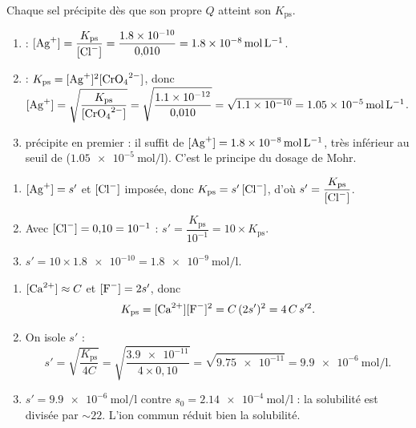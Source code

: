 \documentclass[11pt,a4paper]{article}
\begin{document}
\begin{corrige}
Chaque sel précipite dès que son propre $Q$ atteint son $K_{\mathrm{ps}}$.
\begin{enumerate}[label=\alph*)]
  \item {} : $[\ce{Ag+}]=\dfrac{K_{\mathrm{ps}}}{[\ce{Cl-}]}=\dfrac{\num{1.8e-10}}{0{,}010}
        =\qty{1.8e-8}{\mole\per\litre}$.
  \item {} : $K_{\mathrm{ps}}=[\ce{Ag+}]^{2}[\ce{CrO4^{2-}}]$, donc
        $[\ce{Ag+}]=\sqrt{\dfrac{K_{\mathrm{ps}}}{[\ce{CrO4^{2-}}]}}=\sqrt{\dfrac{\num{1.1e-12}}{0{,}010}}
        =\sqrt{\num{1.1e-10}}=\qty{1.05e-5}{\mole\per\litre}$.
  \item {} précipite en premier : il suffit de $[\ce{Ag+}]=\qty{1.8e-8}{\mole\per\litre}$, très
        inférieur au seuil de  ($\qty{1.05e-5}{\mole\per\litre}$). C'est le principe du
        dosage de Mohr.
\end{enumerate}
\end{corrige}

\begin{corrige}
\begin{enumerate}[label=\alph*)]
  \item $[\ce{Ag+}]=s'$ et $[\ce{Cl-}]$ imposée, donc $K_{\mathrm{ps}}=s'\,[\ce{Cl-}]$, d'où
        $s'=\dfrac{K_{\mathrm{ps}}}{[\ce{Cl-}]}$.
  \item Avec $[\ce{Cl-}]=0{,}10=10^{-1}$ :
        $s'=\dfrac{K_{\mathrm{ps}}}{10^{-1}}=10\times K_{\mathrm{ps}}$.
  \item $s'=10\times\num{1.8e-10}=\qty{1.8e-9}{\mole\per\litre}$.
\end{enumerate}
\end{corrige}

\begin{corrige}
\begin{enumerate}[label=\alph*)]
  \item $[\ce{Ca^{2+}}]\approx C$ et $[\ce{F-}]=2s'$, donc
        \[ K_{\mathrm{ps}} = [\ce{Ca^{2+}}][\ce{F-}]^{2} = C\,(2s')^{2} = 4\,C\,s'^{2}. \]
  \item On isole $s'$ :
        \[ s' = \sqrt{\dfrac{K_{\mathrm{ps}}}{4C}} = \sqrt{\dfrac{\num{3.9e-11}}{4\times 0{,}10}}
             = \sqrt{\num{9.75e-11}} = \qty{9.9e-6}{\mole\per\litre}. \]
  \item $s'=\qty{9.9e-6}{\mole\per\litre}$ contre $s_0=\qty{2.14e-4}{\mole\per\litre}$ : la solubilité
        est divisée par $\sim 22$. L'ion commun  réduit bien la solubilité.
\end{enumerate}
\end{corrige}
\end{document}
